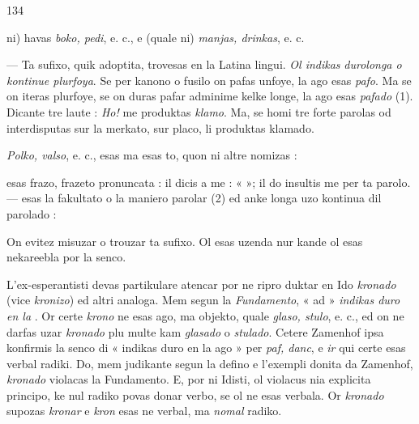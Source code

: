 \begin{VUpage}[138]{134}

\VUcontinue
ni) havas \textit{boko, pedi}, e. c., e (quale ni) \textit{manjas, drinkas}, e. c.\parplein

\nl
{}

 --- Ta sufixo, quik adoptita, trovesas en la Latina\nl
lingui. \textit{Ol indikas}  \textit{durolonga o kontinue plurfoya}. Se per\nl
kanono o fusilo on pafas unfoye, la ago esas \textit{pafo}. Ma se on\nl
iteras plurfoye, se on duras pafar adminime kelke longe, la\nl
ago esas \textit{pafado} (1). Dicante tre laute : \textit{Ho!} me produktas\nl
\textit{klamo}. Ma, se homi tre forte parolas od interdisputas sur\nl
la merkato, sur placo, li produktas klamado.

\textit{Polko, valso}, e. c., esas  ma  esas to, quon ni\nl
altre nomizas : \nl
{}

 esas frazo, frazeto pronuncata : il dicis a me :\nl
«  »; il do insultis me per ta parolo. --- \nl
esas la fakultato o la maniero parolar (2) ed anke longa\nl
uzo kontinua dil parolado : \nl
{}\nl
{}

On evitez misuzar o trouzar ta sufixo. Ol esas uzenda nur\nl
kande ol esas nekareebla por la senco.

L'ex-esperantisti devas partikulare atencar por ne ripro\cc
duktar en Ido \textit{kronado} (vice \textit{kronizo}) ed altri analoga. Mem\nl
segun la \textit{Fundamento}, « ad » \textit{indikas duro en la} . Or certe\nl
\textit{krono} ne esas ago, ma objekto, quale \textit{glaso, stulo}, e. c., ed on\nl
ne darfas uzar \textit{kronado} plu multe kam \textit{glasado} o \textit{stulado}.\nl
Cetere Zamenhof ipsa konfirmis la senco di « indikas duro\nl
en la ago » per \textit{paf, danc}, e \textit{ir} qui certe esas verbal radiki.\nl
Do, mem judikante segun la defino e l'exempli donita da\nl
Zamenhof, \textit{kronado} violacas la Fundamento. E, por ni\nl
Idisti, ol violacus nia explicita principo, ke nul radiko povas\nl
donar verbo, se ol ne esas verbala. Or \textit{kronado} supozas \textit{kronar}\nl
e \textit{kron} esas ne verbal, ma \textit{nomal} radiko.
\end{VUpage}

